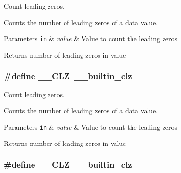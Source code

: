 Count leading zeros. 

Counts the number of leading zeros of a data value. 
\begin{DoxyParams}[1]{Parameters}
\mbox{\tt in}  & {\em value} & Value to count the leading zeros \\
\hline
\end{DoxyParams}
\begin{DoxyReturn}{Returns}
number of leading zeros in value 
\end{DoxyReturn}
\hypertarget{group___c_m_s_i_s___core___instruction_interface_ga5d5bb1527e042be4a9fa5a33f65cc248}{
\subsubsection[{\-\_\-\-\_\-\-C\-L\-Z}]{\setlength{\rightskip}{0pt plus 5cm}\#define \-\_\-\-\_\-\-C\-L\-Z~\-\_\-\-\_\-builtin\-\_\-clz}}\label{group___c_m_s_i_s___core___instruction_interface_ga5d5bb1527e042be4a9fa5a33f65cc248}


Count leading zeros. 

Counts the number of leading zeros of a data value. 
\begin{DoxyParams}[1]{Parameters}
\mbox{\tt in}  & {\em value} & Value to count the leading zeros \\
\hline
\end{DoxyParams}
\begin{DoxyReturn}{Returns}
number of leading zeros in value 
\end{DoxyReturn}
\hypertarget{group___c_m_s_i_s___core___instruction_interface_ga5d5bb1527e042be4a9fa5a33f65cc248}{
\subsubsection[{\-\_\-\-\_\-\-C\-L\-Z}]{\setlength{\rightskip}{0pt plus 5cm}\#define \-\_\-\-\_\-\-C\-L\-Z~\-\_\-\-\_\-builtin\-\_\-clz}}\label{group___c_m_s_i_s___core___instruction_interface_ga5d5bb1527e042be4a9fa5a33f65cc248}


